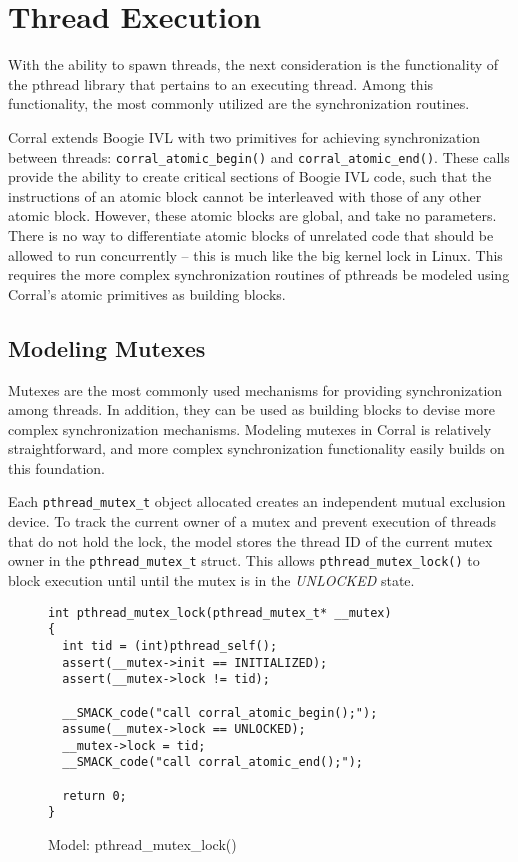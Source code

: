 \section{Thread Execution}
With the ability to spawn threads, the next consideration is the 
functionality of the pthread library that pertains to an executing
thread.  Among this functionality, the most commonly utilized are the
synchronization routines. 

Corral extends Boogie IVL with two primitives for achieving
synchronization between threads: \lstinline|corral_atomic_begin()| and
\lstinline|corral_atomic_end()|.  These calls provide the ability to
create critical sections of Boogie IVL code, such that the
instructions of an atomic block cannot be interleaved with those of
any other atomic block.  However, these atomic blocks are global, and
take no parameters.  There is no way to differentiate atomic blocks of
unrelated code that should be allowed to run concurrently -- this is
much like the big kernel lock in Linux.  This requires the more
complex synchronization routines of pthreads be modeled using
Corral's atomic primitives as building blocks.  

\subsection{Modeling Mutexes}
Mutexes are the most commonly used mechanisms for providing
synchronization among threads.  In addition, they can be used as
building blocks to devise more complex synchronization mechanisms.
Modeling mutexes in Corral is relatively straightforward, and more
complex synchronization functionality easily builds on this
foundation. 

Each \lstinline|pthread_mutex_t| object allocated creates an
independent mutual exclusion device.  To track the current owner of a
mutex and prevent execution of threads that do not hold the lock, the
model stores the thread ID of the current mutex owner in the
\lstinline|pthread_mutex_t| struct.  This allows
\lstinline|pthread_mutex_lock()| to block execution until until the
mutex is in the \emph{UNLOCKED} state.


\begin{figure}[!ht]
\centering
\begin{lstlisting}
int pthread_mutex_lock(pthread_mutex_t* __mutex)
{
  int tid = (int)pthread_self();
  assert(__mutex->init == INITIALIZED);
  assert(__mutex->lock != tid);

  __SMACK_code("call corral_atomic_begin();");
  assume(__mutex->lock == UNLOCKED);
  __mutex->lock = tid;
  __SMACK_code("call corral_atomic_end();");

  return 0;
}
\end{lstlisting}
\caption{Model: pthread\_mutex\_lock()}\label{fig:pthread_mutex_lock}
\end{figure}

